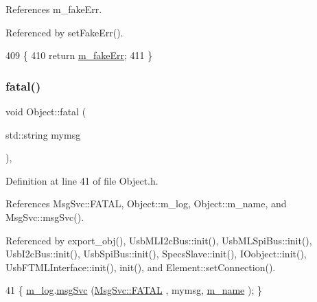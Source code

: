 References m\+\_\+fake\+Err.



Referenced by set\+Fake\+Err().


\begin{DoxyCode}
409                           \{
410     \textcolor{keywordflow}{return} \hyperlink{classUsbFTInterface_ab3660cba031df164b2d2df6e4c40f291}{m\_fakeErr};
411   \}
\end{DoxyCode}
\mbox{\label{classObject_aad5a16aac7516ce65bd5ec02ab07fc80}} 
\subsubsection{\texorpdfstring{fatal()}{fatal()}\hspace{0.1cm}{\footnotesize\ttfamily [1/2]}}
{\footnotesize\ttfamily void Object\+::fatal (\begin{DoxyParamCaption}\item[{std\+::string}]{mymsg }\end{DoxyParamCaption})\hspace{0.3cm}{\ttfamily [inline]}, {\ttfamily [inherited]}}



Definition at line 41 of file Object.\+h.



References Msg\+Svc\+::\+F\+A\+T\+AL, Object\+::m\+\_\+log, Object\+::m\+\_\+name, and Msg\+Svc\+::msg\+Svc().



Referenced by export\+\_\+obj(), Usb\+M\+L\+I2c\+Bus\+::init(), Usb\+M\+L\+Spi\+Bus\+::init(), Usb\+I2c\+Bus\+::init(), Usb\+Spi\+Bus\+::init(), Specs\+Slave\+::init(), I\+Oobject\+::init(), Usb\+F\+T\+M\+L\+Interface\+::init(), init(), and Element\+::set\+Connection().


\begin{DoxyCode}
41 \{ \hyperlink{classObject_a0d269813dd7ac1f24bc143031e2963f2}{m\_log}.\hyperlink{classMsgSvc_ad25f18047920cc59a314e5098259711c}{msgSvc} (\hyperlink{classMsgSvc_ae671eb7301996cd049d2da8a65925926a59c73cb29edfc9cdf35845e2b1301363}{MsgSvc::FATAL}   , mymsg, \hyperlink{classObject_a8b83c95c705d2c3ba0d081fe1710f48d}{m\_name} ); \}
\end{DoxyCode}
\mbox{\label{classObject_ae62acd3d09f716220f75f252dc38bc9a}} 
